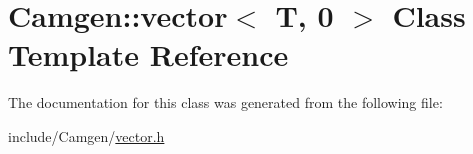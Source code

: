 \hypertarget{a00560}{\section{Camgen\-:\-:vector$<$ T, 0 $>$ Class Template Reference}
\label{a00560}
}


The documentation for this class was generated from the following file\-:\begin{DoxyCompactItemize}
\item 
include/\-Camgen/\hyperlink{a00804}{vector.\-h}\end{DoxyCompactItemize}
